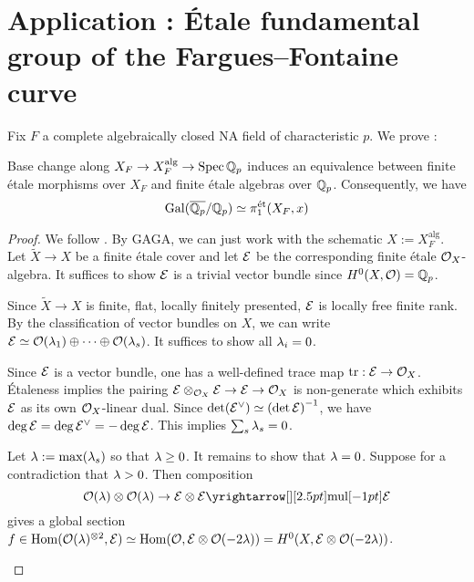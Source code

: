 \documentclass{article}
\begin{document}
\section{Application : Étale fundamental group of the Fargues--Fontaine curve}

Fix $F$ a complete algebraically closed NA field of characteristic $p$.
We prove : 
\begin{prop}
  
  Base change along $X_F \to X_F^{\mathrm{alg}} \to \operatorname{Spec} \mathbb{Q}_p$
  induces an equivalence between finite étale morphisms
  over $X_F$ and finite étale algebras over $\mathbb{Q}_p$.
  Consequently,
  we have \[
    \operatorname{Gal}(\overline{\mathbb{Q}_p} / \mathbb{Q}_p) \simeq \pi_1^{\text{ét}}(X_F , x)
  \]
\end{prop}
\begin{proof}
  We follow \cite[Theorem 13.5.7]{SW20}.
  By GAGA, we can just work with the schematic $X := X_F^{\mathrm{alg}}$.
  Let $\widetilde{X} \to X$ be a finite étale cover
  and let $\mathcal{E}$ be the corresponding finite étale $\mathcal{O}_{X}$-algebra.
  It suffices to show $\mathcal{E}$ is a trivial vector bundle
  since $H^0(X , \mathcal{O}) = \mathbb{Q}_p$.

  Since $\widetilde{X} \to X$ is finite, flat, locally finitely presented,
  $\mathcal{E}$ is locally free finite rank.
  By the classification of vector bundles on $X$,
  we can write $\mathcal{E} \simeq \mathcal{O}(\lambda_1) \oplus \cdots \oplus \mathcal{O}(\lambda_s)$.
  It suffices to show all $\lambda_i = 0$.

  Since $\mathcal{E}$ is a vector bundle,
  one has a well-defined trace map $\mathrm{tr} : \mathcal{E} \to \mathcal{O}_X$.
  Étaleness implies the pairing $\mathcal{E} \otimes_{\mathcal{O}_X} \mathcal{E} \to \mathcal{E} \to \mathcal{O}_X$
  is non-generate 
  which exhibits $\mathcal{E}$ as its own $\mathcal{O}_X$-linear dual.
  \cite[\href{https://stacks.math.columbia.edu/tag/0BVH}{Tag 0BVH}]{stacks-project}
  Since $\det (\mathcal{E}^\vee) \simeq \left(\det \mathcal{E}\right)^{-1}$,
  we have $\deg \mathcal{E} = \deg \mathcal{E}^\vee = - \deg \mathcal{E}$.
  This implies $\sum_{s} \lambda_s = 0$.
  
  Let $\lambda := \max(\lambda_s)$ so that $\lambda \geq 0$.
  It remains to show that $\lambda = 0$.
  Suppose for a contradiction that $\lambda > 0$.
  Then composition \[
    \cO(\la) \otimes \cO(\la) \to \cE \otimes \cE \map{\text{mul}}{} \cE
  \]
  gives a global section $f \in \mathrm{Hom}(\mathcal{O}(\lambda)^{\otimes 2} , \mathcal{E})
  \simeq \mathrm{Hom}(\mathcal{O} , \mathcal{E} \otimes \mathcal{O}(-2 \lambda)) = H^0(X , \mathcal{E} \otimes \mathcal{O}(- 2\lambda))$.
  \begin{lem}
  

\end{lem}
\end{proof}
\end{document}
